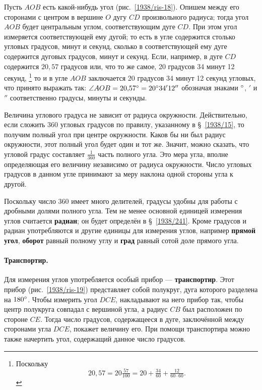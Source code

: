 \documentclass[oneside]{book}
\makeatletter
\newcommand{\rindex}[2][\imki@jobname]{%
  \index[#1]{\detokenize{#2}}%
}
\makeatother
\begin{document}
Пусть $AOB$ есть какой-нибудь угол (рис.~\ref{1938/ris-18}).
Опишем между его сторонами с центром в вершине $O$ дугу $CD$ произвольного радиуса;
тогда угол $AOB$ будет центральным углом, соответствующим дуге $CD$.
При этом угол измеряется соответствующей ему дугой; то есть в угле содержится столько угловых градусов, минут и секунд, сколько в соответствующей ему дуге содержится дуговых градусов, минут и секунд.
Если, например, в дуге $CD$ содержится $20{,}57$ градусов или, что то же самое, 20 градусов 34 минут 12 секунд,%
\footnote{Поскольку \[20{,}57=20\tfrac{57}{100}=20+\tfrac{34}{60}+\tfrac{12}{60\cdot 60}.\]}
 то и в угле $AOB$ заключается 20 градусов 34 минут 12 секунд угловых, что принято выражать так:
$\angle AOB = 20{,}57\degree = 20\degree 34'12''$ обозначая знаками $\degree$, $'$ и $''$ соответственно градусы, минуты и секунды.

Величина углового градуса не зависит от радиуса окружности.
Действительно, если сложить 360 угловых градусов по правилу, указанному в §~\ref{1938/15}, то получим полный угол при центре окружности.
Каков бы ни был радиус окружности, этот полный угол будет один и тот же.
Значит, можно сказать, что угловой градус составляет $\tfrac1{360}$ часть полного угла.
Это мера угла, вполне определяющая его величину независимо от радиуса окружности.
Число угловых градусов в данном угле принимают за меру наклона одной стороны угла к другой.

Поскольку число 360 имеет много делителей,
градусы удобны для работы с дробными долями полного угла.
Тем не менее основной единицей измерения углов считается \textbf{радиан};
он будет определён в §~\ref{1938/241}. 
Кроме градусов и радиан употребляются и другие единицы для измерения углов, например \textbf{прямой угол}, \textbf{оборот} равный полному углу и
\textbf{град} равный сотой доле прямого угла.

\paragraph{Транспортир.}\label{1938/20}
Для измерения углов употребляется особый прибор — \rindex{транспортир}\textbf{транспортир}.
Этот прибор (рис.~\ref{1938/ris-19}) представляет собой полукруг, дуга которого разделена на $180\degree $.
Чтобы измерить угол $DCE$, накладывают на него прибор так, чтобы центр полукруга совпадал с вершиной угла, а радиус $CB$ был расположен по стороне $CE$.
Тогда число градусов, содержащееся в дуге, заключённой между сторонами угла $DCE$, покажет величину его.
При помощи транспортира можно также начертить угол, содержащий данное число градусов.
\end{document}

